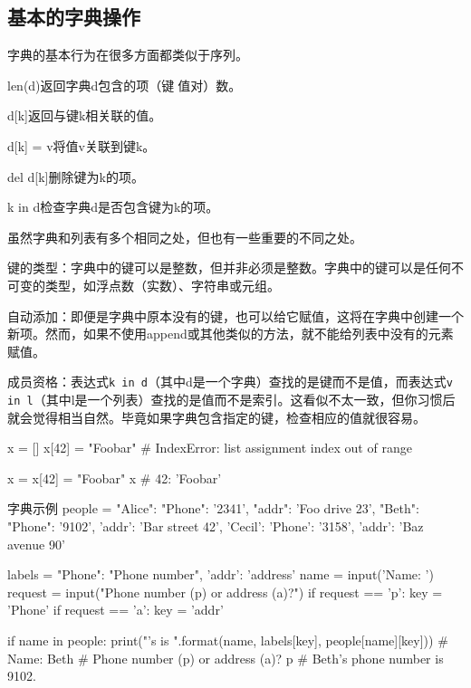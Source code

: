 \subsection{基本的字典操作}
字典的基本行为在很多方面都类似于序列。
\begin{dinglist}{43}
    \item len(d)返回字典d包含的项（键值对）数。
    \item d[k]返回与键k相关联的值。
    \item d[k] = v将值v关联到键k。
    \item del d[k]删除键为k的项。
    \item k in d检查字典d是否包含键为k的项。
\end{dinglist}

虽然字典和列表有多个相同之处，但也有一些重要的不同之处。
\begin{dinglist}{43}
    \item 键的类型：字典中的键可以是整数，但并非必须是整数。字典中的键可以是任何不可变的类型，如浮点数（实数）、字符串或元组。
    \item 自动添加：即便是字典中原本没有的键，也可以给它赋值，这将在字典中创建一个新项。然而，如果不使用append或其他类似的方法，就不能给列表中没有的元素赋值。
    \item 成员资格：表达式\verb|k in d|（其中d是一个字典）查找的是键而不是值，而表达式\verb|v in l|（其中l是一个列表）查找的是值而不是索引。这看似不太一致，但你习惯后就会觉得相当自然。毕竟如果字典包含指定的键，检查相应的值就很容易。
\end{dinglist}


\begin{pyc}
x = []
x[42] = "Foobar"  # IndexError: list assignment index out of range

x = {}
x[42] = "Foobar"
x  # {42: 'Foobar'}
\end{pyc}

\begin{py}{字典示例}
people = {
    "Alice": {"Phone": '2341', "addr": 'Foo drive 23'},
    "Beth": {"Phone": '9102', 'addr': 'Bar street 42'},
    'Cecil': {'Phone': '3158', 'addr': 'Baz avenue 90'}
}

labels = {"Phone": "Phone number", 'addr': 'address'}
name = input('Name: ')
request = input("Phone number (p) or address (a)?")
if request == 'p':
    key = 'Phone'
if request == 'a':
    key = 'addr'

if name in people:
    print("{}'s {} is {}".format(name, labels[key], people[name][key]))
# Name: Beth
# Phone number (p) or address (a)? p
# Beth's phone number is 9102.
\end{py}

